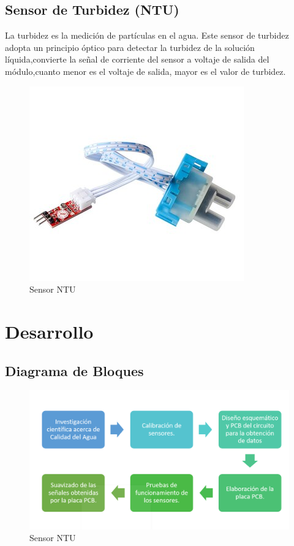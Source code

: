 \documentclass[10pt,a4paper]{article}
\begin{document}
\begin{multicols}{2}
\subsection{Sensor de Turbidez (NTU)}
La turbidez es la medición de partículas en el agua. Este sensor de turbidez adopta un principio óptico para detectar la turbidez de la solución líquida,convierte la señal de corriente del sensor a voltaje de salida del módulo,cuanto menor es el voltaje de salida, mayor es el valor de turbidez. 
\begin{figure}[H]
\centering
\includegraphics[scale=0.4]{TS-300B.jpg}
\caption{Sensor NTU }
\end{figure}

\end{multicols}
\section{Desarrollo}
\subsection{Diagrama de Bloques }
\begin{figure}[H]
\centering
\includegraphics[scale=0.4]{diagrama.png}
\caption{Sensor NTU }
\end{figure}
\end{document}
